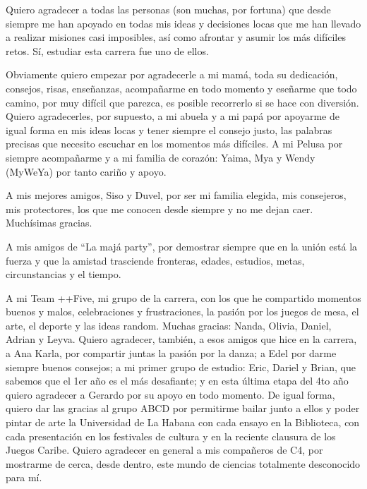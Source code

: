 \begin{acknowledgements}
Quiero agradecer a todas las personas (son muchas, por fortuna) que desde siempre me han apoyado en todas mis ideas y decisiones locas que me han llevado a realizar misiones casi imposibles, as\'i como afrontar y asumir los m\'as dif\'iciles retos. S\'i, estudiar esta carrera fue uno de ellos.

Obviamente quiero empezar por agradecerle a mi mam\'a, toda su dedicaci\'on, consejos, risas, ense\~nanzas, acompa\~narme en todo momento y ese\~narme que todo camino, por muy dif\'icil que parezca, es posible recorrerlo si se hace con diversi\'on. Quiero agradecerles, por supuesto, a mi abuela y a mi pap\'a por apoyarme de igual forma en mis ideas locas y tener siempre el consejo justo, las palabras precisas que necesito escuchar en los momentos m\'as dif\'iciles. A mi Pelusa por siempre acompa\~narme y a mi familia de coraz\'on: Yaima, Mya y Wendy (MyWeYa) por tanto cari\~no y apoyo.

A mis mejores amigos, Siso y Duvel, por ser mi familia elegida, mis consejeros, mis protectores, los que me conocen desde siempre y no me dejan caer. Much\'isimas gracias.

A mis amigos de ``La maj\'a party'', por demostrar siempre que en la uni\'on est\'a la fuerza y que la amistad trasciende fronteras, edades, estudios, metas, circunstancias y el tiempo.

A mi Team ++Five, mi grupo de la carrera, con los que he compartido momentos buenos y malos, celebraciones y frustraciones, la pasi\'on por los juegos de mesa, el arte, el deporte y las ideas random. Muchas gracias: Nanda, Olivia, Daniel, Adrian y Leyva. Quiero agradecer, tambi\'en, a esos amigos que hice en la carrera, a Ana Karla, por compartir juntas la pasi\'on por la danza; a Edel por darme siempre buenos consejos; a mi primer grupo de estudio: Eric, Dariel y Brian, que sabemos que el 1er a\~no es el m\'as desafiante; y en esta \'ultima etapa del 4to a\~no quiero agradecer a Gerardo por su apoyo en todo momento. De igual forma, quiero dar las gracias al grupo ABCD por permitirme bailar junto a ellos y poder pintar de arte la Universidad de La Habana con cada ensayo en la Biblioteca, con cada presentaci\'on en los festivales de cultura y en la reciente clausura de los Juegos Caribe. Quiero agradecer en general a mis compa\~neros de C4, por mostrarme de cerca, desde dentro, este mundo de ciencias totalmente desconocido para m\'i.


\end{acknowledgements}
